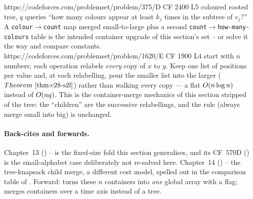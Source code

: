 \begin{practiceset}
    {https://codeforces.com/problemset/problem/375/D}
    {CF 2400 L5}
    {coloured rooted tree, \(q\) queries ``how many colours appear at least
     \(k_j\) times in the subtree of \(v_j\)?''  A \texttt{colour\(\to\)count}
     map merged small-to-large plus a second \texttt{count\(\to\)how-many-
     colours} table is the intended container upgrade of this section's set --
     or solve it the  way and compare constants.}
    {https://codeforces.com/problemset/problem/1620/E}
    {CF 1900 L4}
    {start with \(n\) numbers; each operation relabels \emph{every} copy of \(x\)
     to \(y\).  Keep one list of positions per value and, at each relabelling,
     pour the smaller list into the larger (\(\thmref{c28-s2l}\)) rather than
     walking every copy --- a flat \(O(n\log n)\) instead of
     \(O(nq)\).  This is the container-merge mechanics of this section
     stripped of the tree: the ``children'' are the successive relabellings,
     and the rule (always merge small into big) is unchanged.}
\end{practiceset}

\paragraph{Back-cites and forwards.}
Chapter~13 () --  is the fixed-size
fold this section generalises, and its CF~570D () is the
small-alphabet case deliberately not re-solved here.
Chapter~14 () -- the tree-knapsack child merge, a different cost
model, spelled out in the comparison table of .
Forward:  turns these \(n\) containers into \emph{one} global
array with a  flag;  merges containers over a
time axis instead of a tree.

